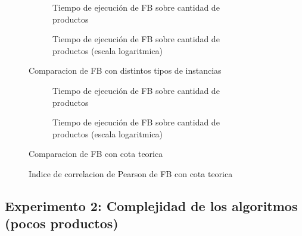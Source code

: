\documentclass[10pt,a4paper]{article}
\begin{document}
\begin{figure}[!ht]
        \centering
        \begin{subfigure}{0.45\linewidth}
            \centering
            
            \caption{Tiempo de ejecución de FB sobre cantidad de productos}
            \label{fig:fb-comparacion-exp}
        \end{subfigure}
        \begin{subfigure}{0.45\linewidth}
            \centering
            
            \caption{Tiempo de ejecución de FB sobre cantidad de productos (escala logaritmica)}
            \label{fig:fb-comparacion-logaritmico}
        \end{subfigure}
        
    \caption{Comparacion de FB con distintos tipos de instancias}
    \label{fig:fb-comparacion}
    \end{figure}
    
\begin{figure}[!ht]
        \centering
        \begin{subfigure}{0.45\linewidth}
            \centering
            
            \caption{Tiempo de ejecución de FB sobre cantidad de productos}
            \label{fig:fb-comparacion-exp}
        \end{subfigure}
        \begin{subfigure}{0.45\linewidth}
            \centering
            
            \caption{Tiempo de ejecución de FB sobre cantidad de productos (escala logaritmica)}
            \label{fig:comparacion-logaritmico}
        \end{subfigure}
        
    \caption{Comparacion de FB con cota teorica}
    \label{fig:fb-comparacion-teorica}
    \end{figure}
    
\begin{figure}[!ht]
        \centering
        
\caption{Indice de correlacion de Pearson de FB con cota teorica}
\label{fig:fb-correlacion}
\end{figure}


\subsection{Experimento 2: Complejidad de los algoritmos (pocos productos)}
\end{document}
